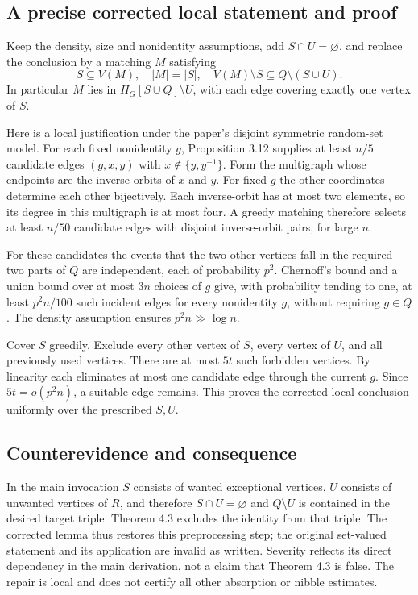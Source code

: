 \documentclass[10pt]{article}
\begin{document}
\subsection*{A precise corrected local statement and proof}
Keep the density, size and nonidentity assumptions, add \(S\cap U=\varnothing\), and replace the conclusion by a matching \(M\) satisfying \[S\subseteq V(M),\quad |M|=|S|,\quad
V(M)\setminus S\subseteq Q\setminus(S\cup U).\] In particular \(M\) lies in \(H_G[S\cup Q]\setminus U\), with each edge covering exactly one vertex of \(S\).\par
Here is a local justification under the paper’s disjoint symmetric random-set model. For each fixed nonidentity \(g\), Proposition 3.12 supplies at least \(n/5\) candidate edges \((g,x,y)\) with \(x\notin\{y,y^{-1}\}\). Form the multigraph whose endpoints are the inverse-orbits of \(x\) and \(y\). For fixed \(g\) the other coordinates determine each other bijectively. Each inverse-orbit has at most two elements, so its degree in this multigraph is at most four. A greedy matching therefore selects at least \(n/50\) candidate edges with disjoint inverse-orbit pairs, for large \(n\).\par
For these candidates the events that the two other vertices fall in the required two parts of \(Q\) are independent, each of probability \(p^2\). Chernoff’s bound and a union bound over at most \(3n\) choices of \(g\) give, with probability tending to one, at least \(p^2n/100\) such incident edges for every nonidentity \(g\), without requiring \(g\in Q\). The density assumption ensures \(p^2n\gg\log n\).\par
Cover \(S\) greedily. Exclude every other vertex of \(S\), every vertex of \(U\), and all previously used vertices. There are at most \(5t\) such forbidden vertices. By linearity each eliminates at most one candidate edge through the current \(g\). Since \(5t=o(p^2n)\), a suitable edge remains. This proves the corrected local conclusion uniformly over the prescribed \(S,U\).\par
\subsection*{Counterevidence and consequence}
In the main invocation \(S\) consists of wanted exceptional vertices, \(U\) consists of unwanted vertices of \(R\), and therefore \(S\cap U=\varnothing\) and \(Q\setminus U\) is contained in the desired target triple. Theorem 4.3 excludes the identity from that triple. The corrected lemma thus restores this preprocessing step; the original set-valued statement and its application are invalid as written. Severity reflects its direct dependency in the main derivation, not a claim that Theorem 4.3 is false. The repair is local and does not certify all other absorption or nibble estimates.\par
\end{document}
